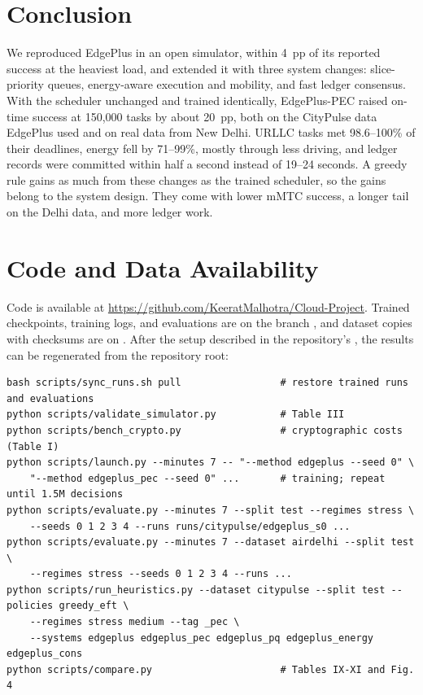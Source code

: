 \documentclass[11pt,journal,onecolumn]{IEEEtran}
\newcommand{\file}[1]{\path{#1}}
\begin{document}
\section{Conclusion}
\label{sec:conclusion}
We reproduced EdgePlus in an open simulator, within 4~pp of its reported success at the heaviest load, and extended it with three system changes: slice-priority queues, energy-aware execution and mobility, and fast ledger consensus. With the scheduler unchanged and trained identically, EdgePlus-PEC raised on-time success at 150,000 tasks by about 20~pp, both on the CityPulse data EdgePlus used and on real data from New Delhi. URLLC tasks met 98.6--100\% of their deadlines, energy fell by 71--99\%, mostly through less driving, and ledger records were committed within half a second instead of 19--24 seconds. A greedy rule gains as much from these changes as the trained scheduler, so the gains belong to the system design. They come with lower mMTC success, a longer tail on the Delhi data, and more ledger work.

\section*{Code and Data Availability}
Code is available at \url{https://github.com/KeeratMalhotra/Cloud-Project}. Trained checkpoints, training logs, and evaluations are on the branch \file{runs-mirror}, and dataset copies with checksums are on \file{data-mirror}. After the setup described in the repository's \file{README.md}, the results can be regenerated from the repository root:
{\footnotesize
\begin{verbatim}
bash scripts/sync_runs.sh pull                 # restore trained runs and evaluations
python scripts/validate_simulator.py           # Table III
python scripts/bench_crypto.py                 # cryptographic costs (Table I)
python scripts/launch.py --minutes 7 -- "--method edgeplus --seed 0" \
    "--method edgeplus_pec --seed 0" ...       # training; repeat until 1.5M decisions
python scripts/evaluate.py --minutes 7 --split test --regimes stress \
    --seeds 0 1 2 3 4 --runs runs/citypulse/edgeplus_s0 ...
python scripts/evaluate.py --minutes 7 --dataset airdelhi --split test \
    --regimes stress --seeds 0 1 2 3 4 --runs ...
python scripts/run_heuristics.py --dataset citypulse --split test --policies greedy_eft \
    --regimes stress medium --tag _pec \
    --systems edgeplus edgeplus_pec edgeplus_pq edgeplus_energy edgeplus_cons
python scripts/compare.py                      # Tables IX-XI and Fig. 4
\end{verbatim}
}
\end{document}
